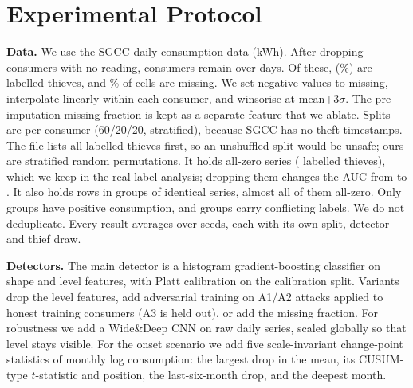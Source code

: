\documentclass[journal]{IEEEtran}
\begin{document}
\section{Experimental Protocol}\label{sec:protocol}
\textbf{Data.} We use the SGCC daily consumption data (kWh). After dropping consumers with no reading, \rNConsumers{} consumers remain over \rNDays{} days. Of these, \rNLabelled{} (\rTheftRate\%) are labelled thieves, and \rNanRate\% of cells are missing. We set negative values to missing, interpolate linearly within each consumer, and winsorise at mean$+3\sigma$. The pre-imputation missing fraction is kept as a separate feature that we ablate. Splits are per consumer (60/20/20, stratified), because SGCC has no theft timestamps. The file lists all labelled thieves first, so an unshuffled split would be unsafe; ours are stratified random permutations. It holds \rDAllZero{} all-zero series (\rDAllZeroThieves{} labelled thieves), which we keep in the real-label analysis; dropping them changes the AUC from \rAucLevel{} to \rAucNonzeroLevel{}. It also holds \rDDupRows{} rows in \rDDupGroups{} groups of identical series, almost all of them all-zero. Only \rDDupGroupsPos{} groups have positive consumption, and \rDDupConflict{} groups carry conflicting labels. We do not deduplicate. Every result averages over \rNSeeds{} seeds, each with its own split, detector and thief draw.

\textbf{Detectors.} The main detector is a histogram gradient-boosting classifier on shape and level features, with Platt calibration on the calibration split. Variants drop the level features, add adversarial training on A1/A2 attacks applied to honest training consumers (A3 is held out), or add the missing fraction. For robustness we add a Wide\&Deep CNN \cite{zheng2018} on raw daily series, scaled globally so that level stays visible. For the onset scenario we add five scale-invariant change-point statistics of monthly log consumption: the largest drop in the mean, its CUSUM-type $t$-statistic and position, the last-six-month drop, and the deepest month.
\end{document}
